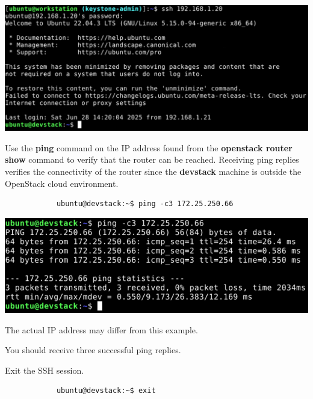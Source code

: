 \documentclass[letterpaper, 12pt]{article}
\begin{document}
\begin{enumerate}
\begin{labstep}
        \begin{center}
            \includegraphics[width=\linewidth]{images/part2/step17.png}
        \end{center}
    \end{labstep}

    \begin{labstep}
        Use the \textbf{ping} command on the IP address found from the \textbf{openstack router show} command to verify that the router can be reached.
        Receiving ping replies verifies the connectivity of the router since the \textbf{devstack} machine is outside the OpenStack cloud environment.
        \begin{lstlisting}
            ubuntu@devstack:~$ ping -c3 172.25.250.66
        \end{lstlisting}

        \begin{center}
            \includegraphics[width=\linewidth]{images/part2/step18.png}
        \end{center}
    \end{labstep}

    \begin{notebox}
        The actual IP address may differ from this example.
    \end{notebox}
    \begin{notebox}
        You should receive three successful ping replies.
    \end{notebox}

    \begin{labstep}
        Exit the SSH session.
        \begin{lstlisting}
            ubuntu@devstack:~$ exit
        \end{lstlisting}


\end{labstep}
\end{enumerate}
\end{document}
